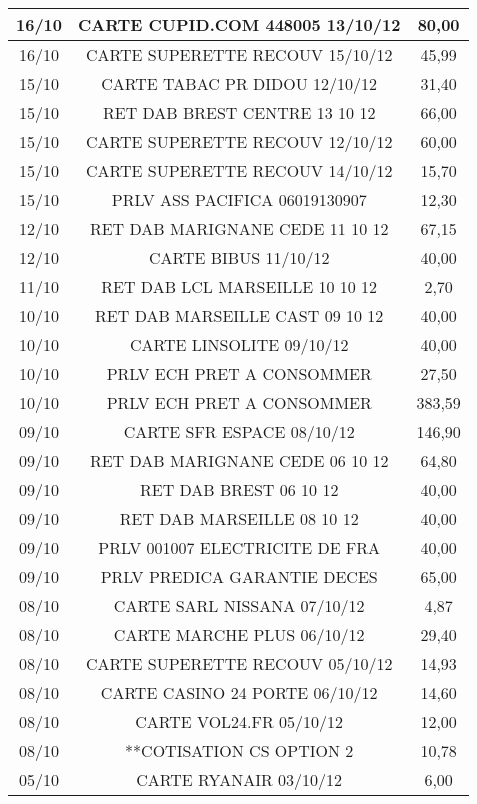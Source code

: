 \begin{longtable}{|c|c|c|}
\hline
16/10 & CARTE CUPID.COM 448005 13/10/12 & 80,00 \\
\hline
16/10 & CARTE SUPERETTE RECOUV 15/10/12 & 45,99 \\
\hline
15/10 & CARTE TABAC PR DIDOU   12/10/12 & 31,40 \\
\hline
15/10 & RET DAB BREST CENTRE   13 10 12 & 66,00 \\
\hline
15/10 & CARTE SUPERETTE RECOUV 12/10/12 & 60,00 \\
\hline
15/10 & CARTE SUPERETTE RECOUV 14/10/12 & 15,70 \\
\hline
15/10 & PRLV   ASS PACIFICA  06019130907 & 12,30 \\
\hline
12/10 & RET DAB MARIGNANE CEDE 11 10 12 & 67,15 \\
\hline
12/10 & CARTE BIBUS            11/10/12 & 40,00 \\
\hline
11/10 & RET DAB LCL MARSEILLE  10 10 12 & 2,70 \\
\hline
10/10 & RET DAB MARSEILLE CAST 09 10 12 & 40,00 \\
\hline
10/10 & CARTE LINSOLITE        09/10/12 & 40,00 \\
\hline
10/10 & PRLV ECH PRET A CONSOMMER & 27,50 \\
\hline
10/10 & PRLV ECH PRET A CONSOMMER & 383,59 \\
\hline
09/10 & CARTE SFR ESPACE       08/10/12 & 146,90 \\
\hline
09/10 & RET DAB MARIGNANE CEDE 06 10 12 & 64,80 \\
\hline
09/10 & RET DAB BREST          06 10 12 & 40,00 \\
\hline
09/10 & RET DAB MARSEILLE      08 10 12 & 40,00 \\
\hline
09/10 & PRLV 001007   ELECTRICITE DE FRA & 40,00 \\
\hline
09/10 & PRLV   PREDICA GARANTIE DECES & 65,00 \\
\hline
08/10 & CARTE SARL NISSANA     07/10/12 & 4,87 \\
\hline
08/10 & CARTE MARCHE PLUS      06/10/12 & 29,40 \\
\hline
08/10 & CARTE SUPERETTE RECOUV 05/10/12 & 14,93 \\
\hline
08/10 & CARTE CASINO 24 PORTE  06/10/12 & 14,60 \\
\hline
08/10 & CARTE VOL24.FR         05/10/12 & 12,00 \\
\hline
08/10 & **COTISATION CS OPTION 2 & 10,78 \\
\hline
05/10 & CARTE RYANAIR          03/10/12 & 6,00 \\

\end{longtable}
